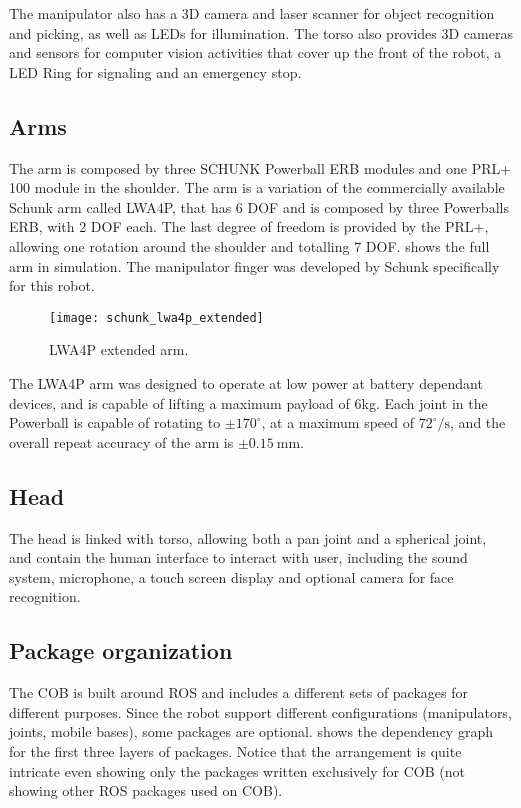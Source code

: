 The manipulator also has a 3D camera and laser scanner for object recognition and picking, as well as LEDs for illumination. The torso also provides 3D cameras and sensors for computer vision activities that cover up the front of the robot, a LED Ring for signaling and an emergency stop.

\subsection{Arms}

The arm is composed by three SCHUNK Powerball ERB modules and one PRL+ 100 module  in  the  shoulder. The arm is a variation of the commercially available Schunk arm called LWA4P, that has 6 DOF and is composed by three Powerballs ERB, with 2 DOF each. The last degree of freedom is provided by the PRL+, allowing one rotation around the shoulder and totalling 7 DOF.  shows the full arm in simulation. The manipulator finger was developed by Schunk specifically for this robot.

\begin{figure}[!ht]
    \centering
    \texttt{[image: schunk\_lwa4p\_extended]}
    \caption{LWA4P extended arm.}
    \label{fig:schunk_lwa4p_extended}
\end{figure}

The LWA4P arm was designed to operate at low power at battery dependant devices, and is capable of lifting a maximum payload of 6kg. Each joint in the Powerball is capable of rotating to $\pm 170^\circ$, at a maximum speed of $72^\circ /\text{s}$, and the overall repeat accuracy of the arm is $\pm 0.15 \ \text{mm}$.


\subsection{Head}

The head is linked with torso, allowing both a pan joint and a spherical joint, and contain the human interface to interact with user, including the sound system, microphone, a touch screen display and optional camera for face recognition.


\subsection{Package organization}

The COB is built around ROS and includes a different sets of packages for different purposes. Since the robot support different configurations (manipulators, joints, mobile bases), some packages are optional.  shows the dependency graph for the first three layers of packages. Notice that the arrangement is quite intricate even showing only the packages written exclusively for COB (not showing other ROS packages used on COB).

